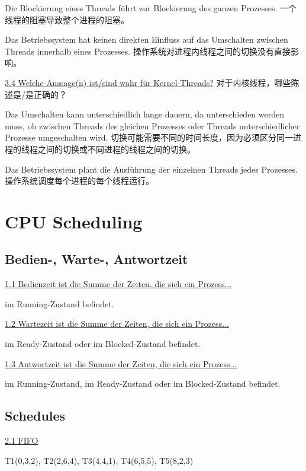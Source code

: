 \documentclass[fleqn]{article}
\begin{document}
Die Blockierung eines Threads führt zur Blockierung des ganzen Prozesses.
一个线程的阻塞导致整个进程的阻塞。

Das Betriebssystem hat keinen direkten Einfluss auf das Umschalten zwischen Threads innerhalb eines Prozesses.
操作系统对进程内线程之间的切换没有直接影响。

\noindent\uline{3.4 Welche Aussage(n) ist/sind wahr für Kernel-Threads?}
对于内核线程，哪些陈述是/是正确的？

Das Umschalten kann unterschiedlich lange dauern, da unterschieden werden muss, ob zwischen Threads des gleichen Prozesses oder Threads unterschiedlicher Prozesse umgeschalten wird.
切换可能需要不同的时间长度，因为必须区分同一进程的线程之间的切换或不同进程的线程之间的切换。

Das Betriebssystem plant die Ausführung der einzelnen Threads jedes Prozesses.
操作系统调度每个进程的每个线程运行。


\section{CPU Scheduling}

\subsection{Bedien-, Warte-, Antwortzeit}

\noindent\uline{1.1 Bedienzeit ist die Summe der Zeiten, die sich ein Prozess...}

im Running-Zustand befindet.

\noindent\uline{1.2 Wartezeit ist die Summe der Zeiten, die sich ein Prozess...}

im  Ready-Zustand oder im Blocked-Zustand befindet.

\noindent\uline{1.3 Antwortzeit ist die Summe der Zeiten, die sich ein Prozess...}

im Running-Zustand, im Ready-Zustand oder im Blocked-Zustand befindet.



\subsection{Schedules}

\noindent\uline{2.1 FIFO}

T1(0,3,2), T2(2,6,4), T3(4,4,1), T4(6,5,5), T5(8,2,3)
\end{document}
